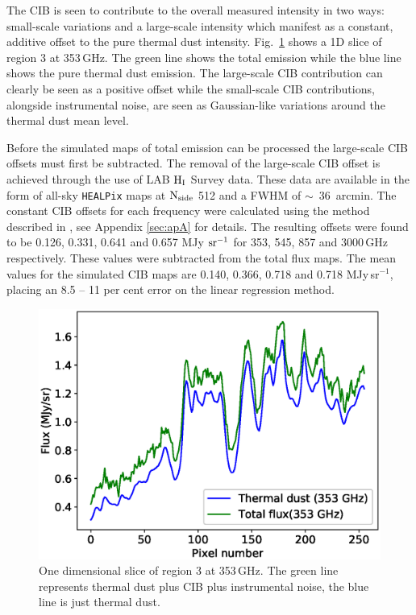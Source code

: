 \documentclass[a4paper,fleqn,usenatbib]{mnras}
\begin{document}
The CIB is seen to contribute to the overall measured intensity in two ways: small-scale variations and a large-scale intensity which manifest as a constant, additive offset to the pure thermal dust intensity. Fig.~\ref{fig:ciboffset} shows a 1D slice of region 3 at 353\,GHz. The green line shows the total emission while the blue line shows the pure thermal dust emission. The large-scale CIB contribution can clearly be seen as a positive offset while the small-scale CIB contributions, alongside instrumental noise, are seen as Gaussian-like variations around the thermal dust mean level. 

Before the simulated maps of total emission can be processed the large-scale CIB offsets must first be subtracted. The removal of the large-scale CIB offset is achieved through the use of LAB $\rm{H_{I}}$ Survey data. These data are available in the form of all-sky {\texttt{HEALPix}} maps \citep{healpix} at $\rm{N_{side}}$ 512 and a FWHM of \mbox{$\sim$ 36 arcmin}. \footnotemark {} The constant CIB offsets for each frequency were calculated using the method described in \citet{pr2}, see Appendix \ref{sec:apA} for details. The resulting offsets were found to be 0.126, 0.331, 0.641 and 0.657 MJy $\rm{sr^{-1}}$ for 353, 545, 857 and 3000\,GHz respectively.  These values were subtracted from the total flux maps. The mean values for the simulated CIB maps are 0.140, 0.366, 0.718 and 0.718 MJy\,sr$^{-1}$, placing an 8.5 -- 11 per cent error on the linear regression method.

\begin{figure}
\centering
\includegraphics[width=0.8\linewidth]{ciboffset353face6}
\caption{One dimensional slice of region 3 at 353\,GHz. The green line represents thermal dust plus CIB plus instrumental noise, the blue line is just thermal dust.}
\label{fig:ciboffset}
\end{figure}
\end{document}
